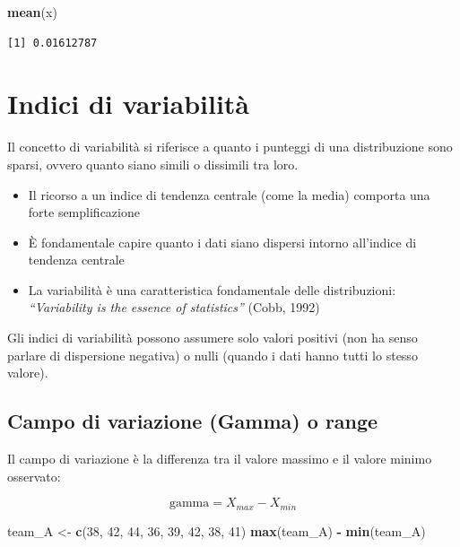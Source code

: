 \documentclass[
  a4paper,
  DIV=11,
  numbers=noendperiod]{scrreprt}
\newenvironment{Shaded}{\begin{snugshade}}{\end{snugshade}}
\newcommand{\DecValTok}[1]{\textcolor[rgb]{0.00,0.00,0.81}{#1}}
\newcommand{\FunctionTok}[1]{\textcolor[rgb]{0.13,0.29,0.53}{\textbf{#1}}}
\newcommand{\NormalTok}[1]{#1}
\newcommand{\OtherTok}[1]{\textcolor[rgb]{0.56,0.35,0.01}{#1}}
\newcommand{\SpecialCharTok}[1]{\textcolor[rgb]{0.81,0.36,0.00}{\textbf{#1}}}
\providecommand{\tightlist}{%
  \setlength{\itemsep}{0pt}\setlength{\parskip}{0pt}}
\begin{document}
\begin{Shaded}
\begin{Highlighting}[]
\FunctionTok{mean}\NormalTok{(x)}
\end{Highlighting}
\end{Shaded}

\begin{verbatim}
[1] 0.01612787
\end{verbatim}

\section{Indici di variabilità}\label{indici-di-variabilituxe0}

Il concetto di variabilità si riferisce a quanto i punteggi di una
distribuzione sono sparsi, ovvero quanto siano simili o dissimili tra
loro.

\begin{itemize}
\tightlist
\item
  Il ricorso a un indice di tendenza centrale (come la media) comporta
  una forte semplificazione
\item
  È fondamentale capire quanto i dati siano dispersi intorno all'indice
  di tendenza centrale
\item
  La variabilità è una caratteristica fondamentale delle distribuzioni:
  \emph{``Variability is the essence of statistics''} (Cobb, 1992)
\end{itemize}

Gli indici di variabilità possono assumere solo valori positivi (non ha
senso parlare di dispersione negativa) o nulli (quando i dati hanno
tutti lo stesso valore).

\subsection{Campo di variazione (Gamma) o
range}\label{campo-di-variazione-gamma-o-range}

Il campo di variazione è la differenza tra il valore massimo e il valore
minimo osservato:

\[\text{gamma} = X_{max} - X_{min}\]

\begin{Shaded}
\begin{Highlighting}[]
\NormalTok{team\_A }\OtherTok{\textless{}{-}} \FunctionTok{c}\NormalTok{(}\DecValTok{38}\NormalTok{, }\DecValTok{42}\NormalTok{, }\DecValTok{44}\NormalTok{, }\DecValTok{36}\NormalTok{, }\DecValTok{39}\NormalTok{, }\DecValTok{42}\NormalTok{, }\DecValTok{38}\NormalTok{, }\DecValTok{41}\NormalTok{)}
\FunctionTok{max}\NormalTok{(team\_A) }\SpecialCharTok{{-}} \FunctionTok{min}\NormalTok{(team\_A)}
\end{Highlighting}
\end{Shaded}
\end{document}
